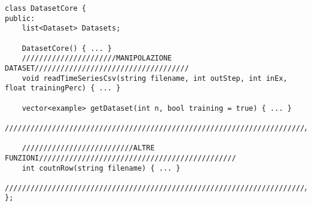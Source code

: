 \documentclass[10pt,a4paper]{article}
\begin{document}
\begin{lstlisting}[style=mycuda, caption=class DatasetCore, captionpos=b]
class DatasetCore {
public:
	list<Dataset> Datasets;

	DatasetCore() { ... }
	//////////////////////MANIPOLAZIONE DATASET////////////////////////////////////
	void readTimeSeriesCsv(string filename, int outStep, int inEx, float trainingPerc) { ... }
	
	vector<example> getDataset(int n, bool training = true) { ... }
	//////////////////////////////////////////////////////////////////////////////////////
	
	//////////////////////////ALTRE FUNZIONI//////////////////////////////////////////////
	int coutnRow(string filename) { ... }
	//////////////////////////////////////////////////////////////////////////////////////
};

\end{lstlisting}
\end{document}

